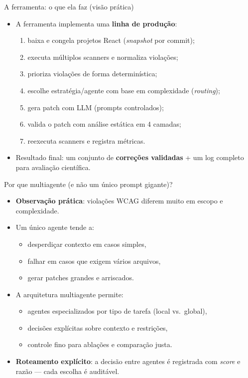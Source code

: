 \documentclass[aspectratio=169]{beamer}
\begin{document}
\begin{frame}{A ferramenta: o que ela faz (visão prática)}
\small
\begin{itemize}
  \item A ferramenta implementa uma \textbf{linha de produção}:
  \begin{enumerate}
    \item baixa e congela projetos React (\emph{snapshot} por commit);
    \item executa múltiplos scanners e normaliza violações;
    \item prioriza violações de forma determinística;
    \item escolhe estratégia/agente com base em complexidade (\emph{routing});
    \item gera patch com LLM (prompts controlados);
    \item valida o patch com análise estática em 4 camadas;
    \item reexecuta scanners e registra métricas.
  \end{enumerate}
  \item Resultado final: um conjunto de \textbf{correções validadas} +
        um log completo para avaliação científica.
\end{itemize}
\end{frame}

\begin{frame}{Por que multiagente (e não um único prompt gigante)?}
\small
\begin{itemize}
  \item \textbf{Observação prática}: violações WCAG diferem muito em escopo e
        complexidade.
  \item Um único agente tende a:
  \begin{itemize}
    \item desperdiçar contexto em casos simples,
    \item falhar em casos que exigem vários arquivos,
    \item gerar patches grandes e arriscados.
  \end{itemize}
  \item A arquitetura multiagente permite:
  \begin{itemize}
    \item agentes especializados por tipo de tarefa (local vs.\ global),
    \item decisões explícitas sobre contexto e restrições,
    \item controle fino para ablações e comparação justa.
  \end{itemize}
  \item \textbf{Roteamento explícito}: a decisão entre agentes é registrada
        com \emph{score} e razão — cada escolha é auditável.
\end{itemize}
\end{frame}
\end{document}
